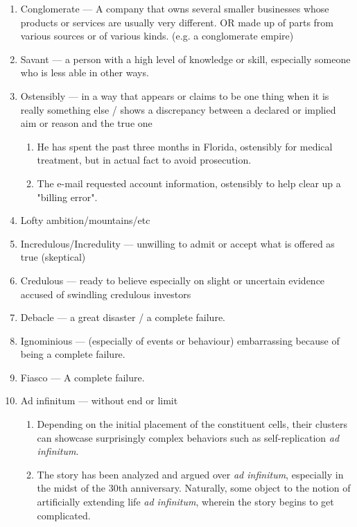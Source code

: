\documentclass[oneside]{book}
\begin{document}
\begin{enumerate}
    \item Conglomerate --- A company that owns several smaller businesses whose products or services are usually very different. OR made up of parts from various sources or of various kinds. (e.g. a conglomerate empire)
    \item Savant --- a person with a high level of knowledge or skill, especially someone who is less able in other ways.
    \item Ostensibly --- in a way that appears or claims to be one thing when it is really something else / shows a discrepancy between a declared or implied aim or reason and the true one
    \footnotesize
    \begin{enumerate}
        \item He has spent the past three months in Florida, ostensibly for medical treatment, but in actual fact to avoid prosecution.
        \item The e-mail requested account information, ostensibly to help clear up a "billing error".
    \end{enumerate}
    \normalsize
    \item Lofty ambition/mountains/etc
    \item Incredulous/Incredulity --- unwilling to admit or accept what is offered as true (skeptical)
    \item Credulous --- ready to believe especially on slight or uncertain evidence\\
    \footnotesize accused of swindling credulous investors \normalsize
    \item Debacle --- a great disaster / a complete failure. 
    \item Ignominious --- (especially of events or behaviour) embarrassing because of being a complete failure.
    \item Fiasco --- A complete failure.
    \item Ad infinitum --- without end or limit
    \footnotesize
    \begin{enumerate}
        \item Depending on the initial placement of the constituent cells, their clusters can showcase surprisingly complex behaviors such as self-replication \emph{ad infinitum}.
        \item The story has been analyzed and argued over \emph{ad infinitum}, especially in the midst of the 30th anniversary.
        Naturally, some object to the notion of artificially extending life \emph{ad infinitum}, wherein the story begins to get complicated.

\end{enumerate}
\end{enumerate}
\end{document}
